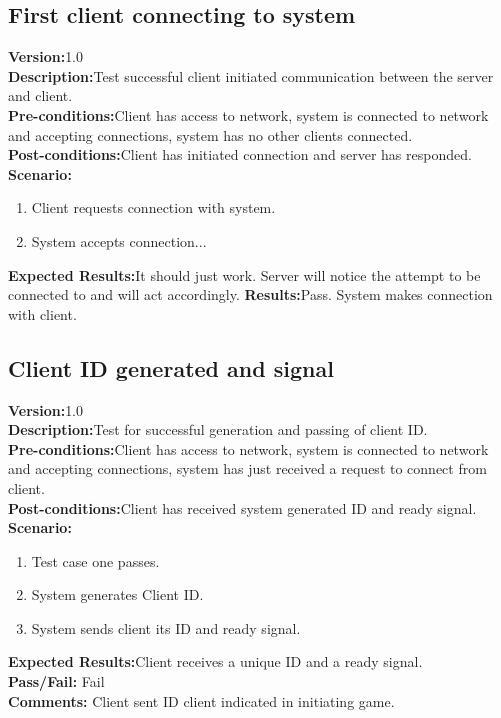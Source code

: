 \documentclass[12pt]{article}
\begin{document}
\subsection{First client connecting to system}
\textbf{Version:}1.0\\
\textbf{Description:}Test successful client initiated communication between the server and client.\\
\textbf{Pre-conditions:}Client has access to network, system is connected to network and accepting connections, system has no other clients connected.\\
\textbf{Post-conditions:}Client has initiated connection and server has responded.\\
\textbf{Scenario:}
\begin{enumerate}
 \item Client requests connection with system.
 \item System accepts connection...
\end{enumerate}
\textbf{Expected Results:}It should just work. Server will notice the attempt to be connected to and will act accordingly.
\textbf{Results:}Pass. System makes connection with client.

\subsection{Client ID generated and signal}
\textbf{Version:}1.0\\
\textbf{Description:}Test for successful generation and passing of client ID.\\
\textbf{Pre-conditions:}Client has access to network, system is connected to network and accepting connections, system has just received a request to connect from client.\\
\textbf{Post-conditions:}Client has received system generated ID and ready signal.\\
\textbf{Scenario:}
\begin{enumerate}
 \item Test case one passes.
 \item System generates Client ID.
 \item System sends client its ID and ready signal.
\end{enumerate}
\textbf{Expected Results:}Client receives a unique ID and a ready signal.\\
\textbf{Pass/Fail:} Fail\\
\textbf{Comments:} Client sent ID client indicated in initiating game.\\
\end{document}

